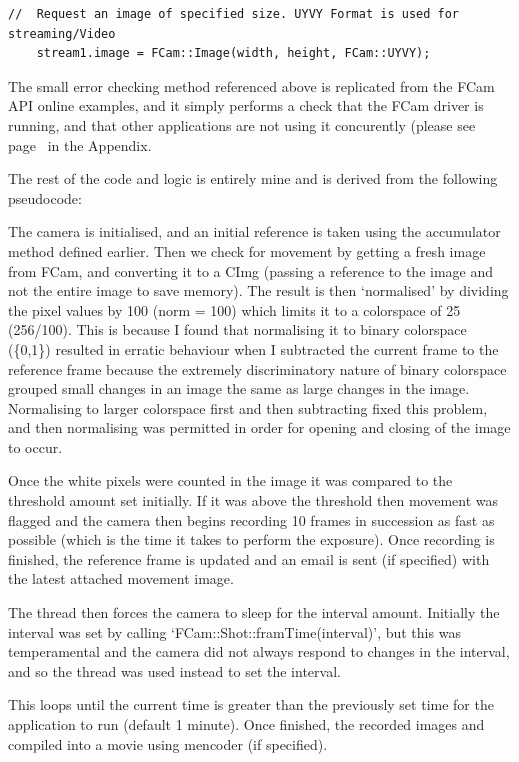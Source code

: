 \documentclass[11pt]{article} %
\begin{document}
{{\begin{lstlisting}[title=\bf Snippet initialise() function in Operations.cpp]
    //  Request an image of specified size. UYVY Format is used for streaming/Video
    stream1.image = FCam::Image(width, height, FCam::UYVY);
\end{lstlisting}
The small error checking method referenced above is replicated from the FCam API online examples, and it simply performs a check that the FCam driver is running, and that other applications are not using it concurently (please see page~\pageref{operations} in the Appendix.

The rest of the code and logic is entirely mine and is derived from the following pseudocode:
\begin{frame}{}
	
\end{frame}
The camera is initialised, and an initial reference is taken using the accumulator method defined earlier. Then we check for movement by getting a fresh image from FCam, and converting it to a CImg (passing a reference to the image and not the entire image to save memory). The result is then ‘normalised’ by dividing the pixel values by 100 (norm = 100) which limits it to a colorspace of 25 (256/100). This is because I found that normalising it to binary colorspace (\{0,1\}) resulted in erratic behaviour when I subtracted the current frame to the reference frame because the extremely discriminatory nature of binary colorspace grouped small changes in an image the same as  large changes in the image. Normalising to larger colorspace first and then subtracting fixed this problem, and then normalising was permitted in order for opening and closing of the image to occur.

Once the white pixels were counted in the image it was compared to the threshold amount set initially. If it was above the threshold then movement was flagged and the camera then begins recording 10 frames in succession as fast as possible (which is the time it takes to perform the exposure). Once recording is finished, the reference frame is updated and an email is sent (if specified) with the latest attached movement image. 

The thread then forces the camera to sleep for the interval amount. Initially the interval was set by calling ‘FCam::Shot::framTime(interval)’, but this was temperamental and the camera did not always respond to changes in the interval, and so the thread was used instead to set the interval.

This loops until the current time is greater than the previously set time for the application to run (default 1 minute). Once finished, the recorded images and compiled into a movie using mencoder (if specified).

}}
\end{document}
